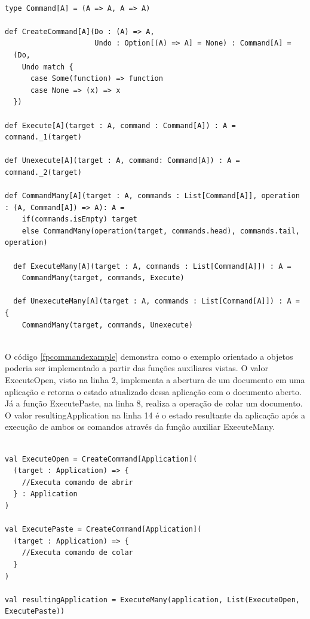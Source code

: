 \begin{lstlisting}[caption={Command Funcional},label=fpcommand]
    
type Command[A] = (A => A, A => A)

def CreateCommand[A](Do : (A) => A,
                     Undo : Option[(A) => A] = None) : Command[A] =
  (Do,
    Undo match {
      case Some(function) => function
      case None => (x) => x
  })

def Execute[A](target : A, command : Command[A]) : A = command._1(target)

def Unexecute[A](target : A, command: Command[A]) : A = command._2(target)

def CommandMany[A](target : A, commands : List[Command[A]], operation : (A, Command[A]) => A): A =
    if(commands.isEmpty) target
    else CommandMany(operation(target, commands.head), commands.tail, operation)

  def ExecuteMany[A](target : A, commands : List[Command[A]]) : A =
    CommandMany(target, commands, Execute)

  def UnexecuteMany[A](target : A, commands : List[Command[A]]) : A = {
    CommandMany(target, commands, Unexecute)
    
\end{lstlisting}

O código \ref{fpcommandexample} demonstra como o exemplo 
orientado a objetos poderia ser implementado a partir das 
funções auxiliares vistas. O valor ExecuteOpen, visto 
na linha 2, implementa a abertura de um documento em uma 
aplicação e retorna o estado atualizado dessa aplicação 
com o documento aberto. Já a função ExecutePaste, na 
linha 8, realiza a operação de colar um documento. 
O valor resultingApplication na linha 14 é o estado 
resultante da aplicação após a execução de ambos os 
comandos através da função auxiliar ExecuteMany.

\begin{lstlisting}[caption={Exemplo funcional de Command},label=fpcommandexample]
    
val ExecuteOpen = CreateCommand[Application](
  (target : Application) => {
    //Executa comando de abrir
  } : Application
)

val ExecutePaste = CreateCommand[Application](
  (target : Application) => {
    //Executa comando de colar
  }
)
  
val resultingApplication = ExecuteMany(application, List(ExecuteOpen, ExecutePaste))
    
\end{lstlisting}

